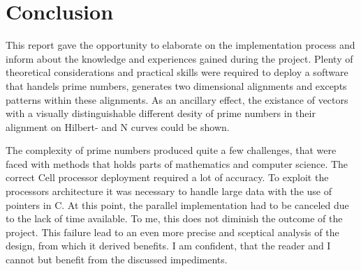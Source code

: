 \section{Conclusion}
\label{sec:conclusion}

This report gave the opportunity to elaborate on the implementation process and inform about the knowledge and experiences gained during the project. Plenty of theoretical considerations and practical skills were required to deploy a software that handels prime numbers, generates two dimensional alignments and excepts patterns within these alignments. As an ancillary effect, the existance of vectors with a visually distinguishable different desity of prime numbers in their alignment on Hilbert- and N curves could be shown.

The complexity of prime numbers produced quite a few challenges, that were faced with methods that holds parts of mathematics and computer science. The correct Cell processor deployment required a lot of accuracy. To exploit the processors architecture it was necessary to handle large data with the use of pointers in C. At this point, the parallel implementation had to be canceled due to the lack of time available. To me, this does not diminish the outcome of the project. This failure lead to an even more precise and sceptical analysis of the design, from which it derived benefits. I am confident, that the reader and I cannot but benefit from the discussed impediments.


